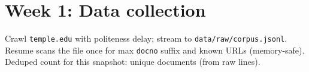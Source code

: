 \section{Week 1: Data collection}
Crawl \texttt{temple.edu} with politeness delay; stream to \texttt{data/raw/corpus.jsonl}. Resume scans the file once for max \texttt{docno} suffix and known URLs (memory-safe). Deduped count for this snapshot: \textbf{{\DedupDocs}} unique documents (from \textbf{{\RawCorpusLines}} raw lines).
